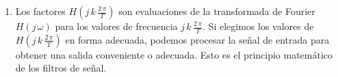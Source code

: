 \begin{enumerate}
\item Los factores $H(j \, k \, \frac{2 \, \pi}{T})$ son evaluaciones de la transformada de Fourier $H(j \, \omega)$ para los valores de frecuencia $j \, k \, \frac{2 \, \pi}{T}$. Si elegimos los valores de $H(j \, k \, \frac{2 \, \pi}{T})$ en forma adecuada, podemos procesar la señal de entrada para obtener una salida conveniente o adecuada. Esto es el principio matemático de los filtros de señal.

\end{enumerate}
%
%
%
%
